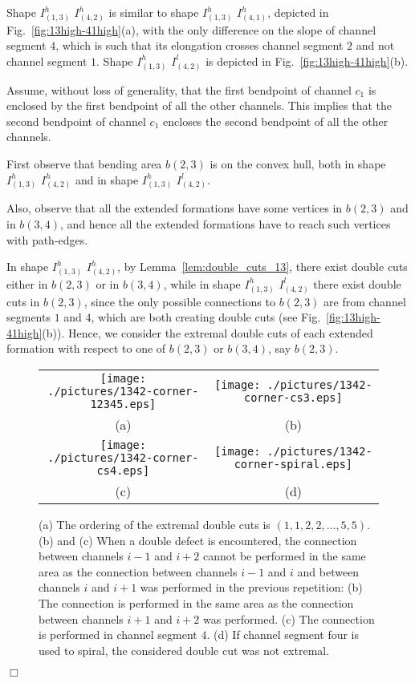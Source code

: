 \documentclass[a4paper,10pt]{llncs}
\renewenvironment{proof}
{{\bf Proof:}}{\hspace*{\fill}$\Box$\par\vspace{2mm}}
\begin{document}
\begin{proof}
Shape $I_{(1,3)}^h$ $I_{(4,2)}^{h}$ is similar to shape $I_{(1,3)}^h$ $I_{(4,1)}^{h}$, depicted in Fig.~\ref{fig:13high-41high}(a), with the only difference on the slope of channel segment $4$, which is such that its elongation crosses channel segment $2$ and not channel segment $1$. Shape $I_{(1,3)}^h$ $I_{(4,2)}^{l}$ is depicted in Fig.~\ref{fig:13high-41high}(b).

Assume, without loss of generality, that the first bendpoint of channel $c_1$ is enclosed by the first bendpoint of all the other channels. This implies that the second bendpoint of channel $c_1$ encloses the second bendpoint of all the other channels.

First observe that bending area $b(2,3)$ is on the convex hull, both in shape $I_{(1,3)}^h$ $I_{(4,2)}^h$ and in shape $I_{(1,3)}^h$ $I_{(4,2)}^l$.

Also, observe that all the extended formations have some vertices in $b(2,3)$ and in $b(3,4)$, and hence all the extended formations have to reach such vertices with path-edges.

In shape $I_{(1,3)}^h$ $I_{(4,2)}^h$, by Lemma~\ref{lem:double_cuts_13}, there exist double cuts either in $b(2,3)$ or in $b(3,4)$, while in shape $I_{(1,3)}^h$ $I_{(4,2)}^l$ there exist double cuts in $b(2,3)$, since the only possible connections to $b(2,3)$ are from channel segments $1$ and $4$, which are both creating double cuts (see Fig.~\ref{fig:13high-41high}(b)). Hence, we consider the extremal double cuts of each extended formation with respect to one of $b(2,3)$ or $b(3,4)$, say $b(2,3)$.

\begin{figure}[htb]
\begin{center}
\begin{tabular}{cc}
\mbox{\texttt{[image: ./pictures/1342-corner-12345.eps]}} \hspace{0.1cm} &
\mbox{\texttt{[image: ./pictures/1342-corner-cs3.eps]}} \\
(a) & (b)\\
\mbox{\texttt{[image: ./pictures/1342-corner-cs4.eps]}} \hspace{0.1cm} &
\mbox{\texttt{[image: ./pictures/1342-corner-spiral.eps]}} \\
(c) & (d)\\
\end{tabular}
\caption{(a) The ordering of the extremal double cuts is $(1,1,2,2,\dots,5,5)$. (b) and (c) When a double defect is encountered, the connection between channels $i-1$ and $i+2$ cannot be performed in the same area as the connection between channels $i-1$ and $i$ and between channels $i$ and $i+1$ was performed in the previous repetition: (b) The connection is performed in the same area as the connection between channels $i+1$ and $i+2$ was performed. (c) The connection is performed in channel segment $4$. (d) If channel segment four is used to spiral, the considered double cut was not extremal.}\label{fig:bend23-no-ordered}
\end{center}
\end{figure}


\end{proof}
\end{document}
